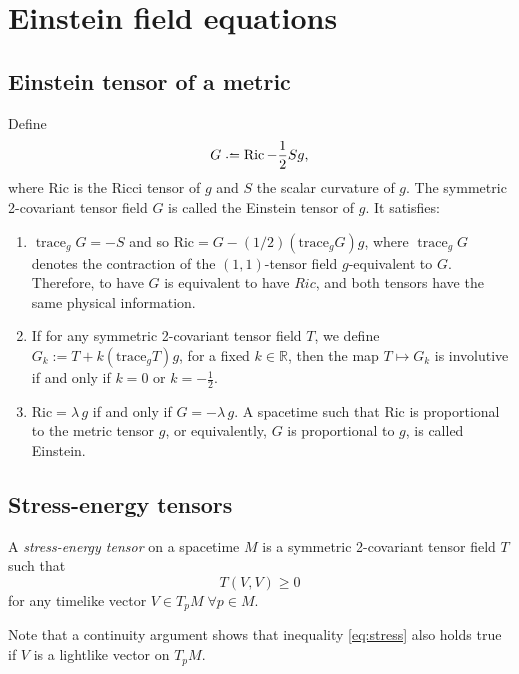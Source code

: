 \chapter{Einstein field equations}

\section{Einstein tensor of a metric}

Define
\[
	G \defeq \operatorname{Ric}-\frac{1}{2}Sg,
\]
where Ric is the Ricci tensor of $g$ and $S$ the scalar curvature of $g$. The symmetric 2-covariant tensor field $G$ is called the Einstein tensor of $g$. It satisfies:

\begin{enumerate}
	\item $\operatorname{trace}_gG=-S$ and so $\mathrm{Ric}=G-(1/2)(\mathrm{trace}_gG)g$, where $\operatorname{trace}_gG$ denotes the contraction of the $(1,1)$-tensor field $g$-equivalent to $G$. Therefore, to have $G$ is equivalent to have $Ric$, and both tensors have the same physical information.
	\item If for any symmetric 2-covariant tensor field $T$, we define $G_k:=T+k(\mathrm{trace}_gT)g$, for a fixed $k\in \mathbb{R}$, then the map $T \longmapsto G_k$ is involutive if and only if $k=0$ or $k=-\frac{1}{2}$.
	\item $\mathrm{Ric}=\lambda\,g$ if and only if $G=-\lambda\,g$. A spacetime such that Ric is proportional to the metric tensor $g$, or equivalently, $G$ is proportional to $g$, is called Einstein.
\end{enumerate}

\section{Stress-energy tensors}

\begin{definition}
	A \emph{stress-energy tensor} on a spacetime $M$ is a symmetric 2-covariant tensor field $T$ such that
	\begin{equation}
	\label{eq:stress}
		T(V,V) \geq 0
	\end{equation}
	for any timelike vector $V \in T_p M \; \forall p \in M$.
\end{definition}

Note that a continuity argument shows that inequality \ref{eq:stress} also holds true if $V$ is a lightlike vector on $T_p M$.

